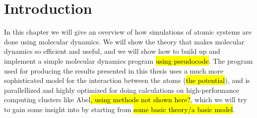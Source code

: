 \chapter{Introduction}
In this chapter we will give an overview of how simulations of atomic systems are done using molecular dynamics. We will show the theory that makes molecular dynamics so efficient and useful, and we will show how to build up and implement a simple molecular dynamics program \hl{using pseudocode}. The program used for producing the results presented in this thesis uses a much more sophisticated model for the interaction between the atoms (\hl{the potential}), and is parallellized and highly optimized for doing calculations on high-performance computing clusters like Abel\hl{, using methods not shown here?}, which we will try to gain some insight into by starting from \hl{some basic theory/a basic model}.

% 
% 
% 
% 

